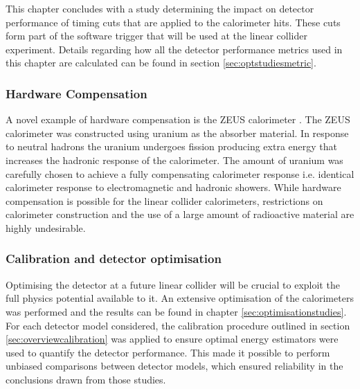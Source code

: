 This chapter concludes with a study determining the impact on detector performance of timing cuts that are applied to the calorimeter hits.  These cuts form part of the software trigger that will be used at the linear collider experiment.  Details regarding how all the detector performance metrics used in this chapter are calculated can be found in section \ref{sec:optstudiesmetric}.


\subsubsection{Hardware Compensation}
A novel example of hardware compensation is the ZEUS calorimeter \cite{Derrick:1991tq}.  The ZEUS calorimeter was constructed using uranium as the absorber material.  In response to neutral hadrons the uranium undergoes fission producing extra energy that increases the hadronic response of the calorimeter.  The amount of uranium was carefully chosen to achieve a fully compensating calorimeter response i.e. identical calorimeter response to electromagnetic and hadronic showers.  While hardware compensation is possible for the linear collider calorimeters, restrictions on calorimeter construction and the use of a large amount of radioactive material are highly undesirable.  


\subsubsection{Calibration and detector optimisation}
Optimising the detector at a future linear collider will be crucial to exploit the full physics potential available to it.  An extensive optimisation of the calorimeters was performed and the results can be found in chapter \ref{sec:optimisationstudies}.  For each detector model considered, the calibration procedure outlined in section \ref{sec:overviewcalibration} was applied to ensure optimal energy estimators were used to quantify the detector performance.  This made it possible to perform unbiased comparisons between detector models, which ensured reliability in the conclusions drawn from those studies.


